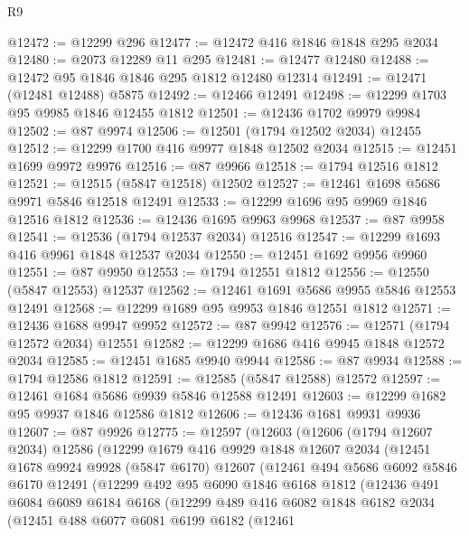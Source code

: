\begin{lexlean}{R9}
\begin{coremodule}
@12472 := @12299 @296
@12477 := @12472 @416 @1846 @1848 @295 @2034
@12480 := @2073 @12289 @11 @295
@12481 := @12477 @12480
@12488 := @12472 @95 @1846 @1846 @295 @1812 @12480 @12314
@12491 := @12471 (@12481 @12488) @5875
@12492 := @12466 @12491
@12498 := @12299 @1703 @95 @9985 @1846 @12455 @1812
@12501 := @12436 @1702 @9979 @9984
@12502 := @87 @9974
@12506 := @12501 (@1794 @12502 @2034) @12455
@12512 := @12299 @1700 @416 @9977 @1848 @12502 @2034
@12515 := @12451 @1699 @9972 @9976
@12516 := @87 @9966
@12518 := @1794 @12516 @1812
@12521 := @12515 (@5847 @12518) @12502
@12527 := @12461 @1698 @5686 @9971 @5846 @12518 @12491
@12533 := @12299 @1696 @95 @9969 @1846 @12516 @1812
@12536 := @12436 @1695 @9963 @9968
@12537 := @87 @9958
@12541 := @12536 (@1794 @12537 @2034) @12516
@12547 := @12299 @1693 @416 @9961 @1848 @12537 @2034
@12550 := @12451 @1692 @9956 @9960
@12551 := @87 @9950
@12553 := @1794 @12551 @1812
@12556 := @12550 (@5847 @12553) @12537
@12562 := @12461 @1691 @5686 @9955 @5846 @12553 @12491
@12568 := @12299 @1689 @95 @9953 @1846 @12551 @1812
@12571 := @12436 @1688 @9947 @9952
@12572 := @87 @9942
@12576 := @12571 (@1794 @12572 @2034) @12551
@12582 := @12299 @1686 @416 @9945 @1848 @12572 @2034
@12585 := @12451 @1685 @9940 @9944
@12586 := @87 @9934
@12588 := @1794 @12586 @1812
@12591 := @12585 (@5847 @12588) @12572
@12597 := @12461 @1684 @5686 @9939 @5846 @12588 @12491
@12603 := @12299 @1682 @95 @9937 @1846 @12586 @1812
@12606 := @12436 @1681 @9931 @9936
@12607 := @87 @9926
@12775 := @12597
    (@12603
      (@12606
        (@1794 @12607 @2034)
        @12586
        (@12299
          @1679
          @416
          @9929
          @1848
          @12607
          @2034
          (@12451
            @1678
            @9924
            @9928
            (@5847 @6170)
            @12607
            (@12461
              @494
              @5686
              @6092
              @5846
              @6170
              @12491
              (@12299
                @492
                @95
                @6090
                @1846
                @6168
                @1812
                (@12436
                  @491
                  @6084
                  @6089
                  @6184
                  @6168
                  (@12299
                    @489
                    @416
                    @6082
                    @1848
                    @6182
                    @2034
                    (@12451
                      @488
                      @6077
                      @6081
                      @6199
                      @6182
                      (@12461

\end{coremodule}
\end{lexlean}
